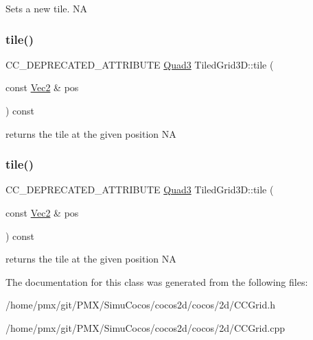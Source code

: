 Sets a new tile.  NA \mbox{\label{classTiledGrid3D_ac7d0e5bdfb4a6bb8049649bc278dc14f}} 
\subsubsection{\texorpdfstring{tile()}{tile()}\hspace{0.1cm}{\footnotesize\ttfamily [1/2]}}
{\footnotesize\ttfamily C\+C\+\_\+\+D\+E\+P\+R\+E\+C\+A\+T\+E\+D\+\_\+\+A\+T\+T\+R\+I\+B\+U\+TE \hyperlink{structQuad3}{Quad3} Tiled\+Grid3\+D\+::tile (\begin{DoxyParamCaption}\item[{const \hyperlink{classVec2}{Vec2} \&}]{pos }\end{DoxyParamCaption}) const\hspace{0.3cm}{\ttfamily [inline]}}

returns the tile at the given position  NA \mbox{\label{classTiledGrid3D_ac7d0e5bdfb4a6bb8049649bc278dc14f}} 
\subsubsection{\texorpdfstring{tile()}{tile()}\hspace{0.1cm}{\footnotesize\ttfamily [2/2]}}
{\footnotesize\ttfamily C\+C\+\_\+\+D\+E\+P\+R\+E\+C\+A\+T\+E\+D\+\_\+\+A\+T\+T\+R\+I\+B\+U\+TE \hyperlink{structQuad3}{Quad3} Tiled\+Grid3\+D\+::tile (\begin{DoxyParamCaption}\item[{const \hyperlink{classVec2}{Vec2} \&}]{pos }\end{DoxyParamCaption}) const\hspace{0.3cm}{\ttfamily [inline]}}

returns the tile at the given position  NA 

The documentation for this class was generated from the following files\+:\begin{DoxyCompactItemize}
\item 
/home/pmx/git/\+P\+M\+X/\+Simu\+Cocos/cocos2d/cocos/2d/C\+C\+Grid.\+h\item 
/home/pmx/git/\+P\+M\+X/\+Simu\+Cocos/cocos2d/cocos/2d/C\+C\+Grid.\+cpp\end{DoxyCompactItemize}

